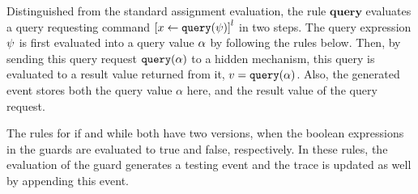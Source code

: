 

Distinguished from the standard assignment evaluation, 
the rule $\textbf{query}$ 
evaluates a query requesting command $\clabel{\assign{x}{\query(\qexpr)}}^l$ in two steps.
The query expression $\psi$ is first evaluated into a query value $\alpha$ by following the rules below.
Then, by sending this query request ${\tt query}(\alpha)$  to a hidden mechanism, this query is evaluated to a result value returned from it, $v = {\tt query}(\alpha)$.
Also, the generated event stores both the query value $\alpha$ here, and the result value of the query request.

The rules for if and while both have two versions, 
when the boolean expressions in the guards are evaluated to true and false, respectively. 
In these rules, the evaluation of the guard generates a testing event and the trace is updated as well by appending this event.

